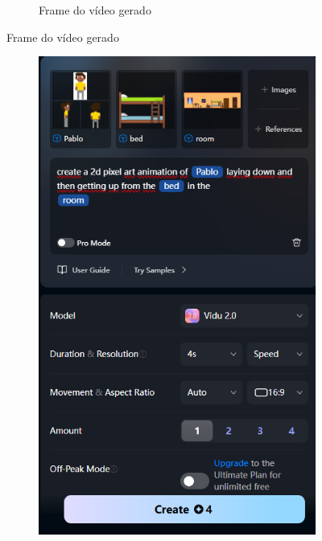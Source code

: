 \begin{figure}[htbp]
\begin{subfigure}{0.55\linewidth}
        \caption{\small Frame do vídeo gerado}
        \label{fig:vidu7b}
    \end{subfigure}
\end{figure}

\begin{figure}[htbp]
    \centering
    \caption{\small Processo da utilização 3 do Vidu em agosto/2025}
    \label{fig:vidu8}
    \begin{subfigure}{0.35\linewidth}
        \includegraphics[width=1\linewidth]{figs/vidu/tela8.PNG}

\end{subfigure}
\end{figure}
